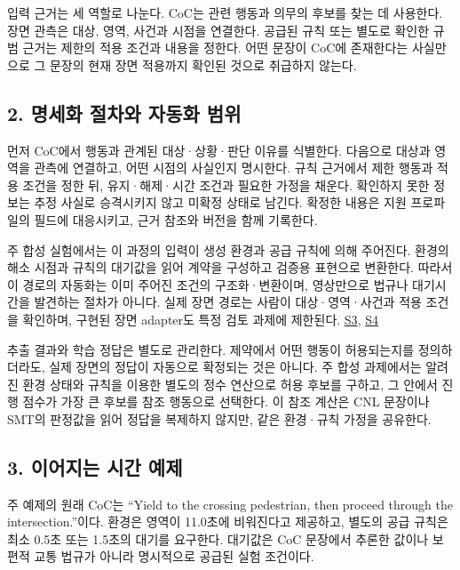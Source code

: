 \documentclass[11pt,a4paper]{article}
\begin{document}
입력 근거는 세 역할로 나눈다. CoC는 관련 행동과 의무의 후보를 찾는 데 사용한다. 장면 관측은 대상, 영역, 사건과 시점을 연결한다. 공급된 규칙 또는 별도로 확인한 규범 근거는 제한의 적용 조건과 내용을 정한다. 어떤 문장이 CoC에 존재한다는 사실만으로 그 문장의 현재 장면 적용까지 확인된 것으로 취급하지 않는다.\par

\subsection*{2. 명세화 절차와 자동화 범위}

먼저 CoC에서 행동과 관계된 대상·상황·판단 이유를 식별한다. 다음으로 대상과 영역을 관측에 연결하고, 어떤 시점의 사실인지 명시한다. 규칙 근거에서 제한 행동과 적용 조건을 정한 뒤, 유지·해제·시간 조건과 필요한 가정을 채운다. 확인하지 못한 정보는 추정 사실로 승격시키지 않고 미확정 상태로 남긴다. 확정한 내용은 지원 프로파일의 필드에 대응시키고, 근거 참조와 버전을 함께 기록한다.\par

주 합성 실험에서는 이 과정의 입력이 생성 환경과 공급 규칙에 의해 주어진다. 환경의 해소 시점과 규칙의 대기값을 읽어 계약을 구성하고 검증용 표현으로 변환한다. 따라서 이 경로의 자동화는 이미 주어진 조건의 구조화·변환이며, 영상만으로 법규나 대기시간을 발견하는 절차가 아니다. 실제 장면 경로는 사람이 대상·영역·사건과 적용 조건을 확인하며, 구현된 장면 adapter도 특정 검토 과제에 제한된다. \href{\detokenize{../../../../../../projects/04-guardsynth-coc/experiments/paper1_cnl_learning/temporal_training_data.py}}{S3}, \href{\detokenize{../../../../../../projects/04-guardsynth-coc/src/guard_synth/qualitative_scene_contract.py}}{S4}\par

추출 결과와 학습 정답은 별도로 관리한다. 제약에서 어떤 행동이 허용되는지를 정의하더라도, 실제 장면의 정답이 자동으로 확정되는 것은 아니다. 주 합성 과제에서는 알려진 환경 상태와 규칙을 이용한 별도의 정수 연산으로 허용 후보를 구하고, 그 안에서 진행 점수가 가장 큰 후보를 참조 행동으로 선택한다. 이 참조 계산은 CNL 문장이나 SMT의 판정값을 읽어 정답을 복제하지 않지만, 같은 환경·규칙 가정을 공유한다.\par

\subsection*{3. 이어지는 시간 예제}

주 예제의 원래 CoC는 “Yield to the crossing pedestrian, then proceed through the intersection.”이다. 환경은 영역이 11.0초에 비워진다고 제공하고, 별도의 공급 규칙은 최소 0.5초 또는 1.5초의 대기를 요구한다. 대기값은 CoC 문장에서 추론한 값이나 보편적 교통 법규가 아니라 명시적으로 공급된 실험 조건이다.\par
\end{document}
